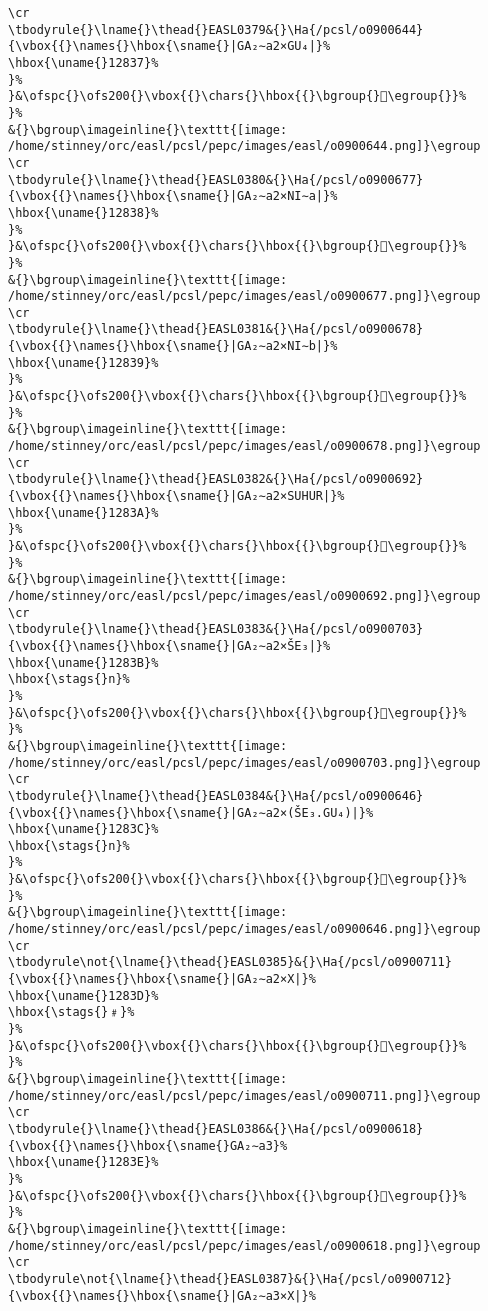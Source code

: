 \begin{verbatim}
\cr
\tbodyrule{}\lname{}\thead{}EASL0379&{}\Ha{/pcsl/o0900644}{\vbox{{}\names{}\hbox{\sname{}|GA₂∼a2×GU₄|}%
\hbox{\uname{}12837}%
}%
}&\ofspc{}\ofs200{}\vbox{{}\chars{}\hbox{{}\bgroup{}𒠷\egroup{}}%
}%
&{}\bgroup\imageinline{}\texttt{[image: /home/stinney/orc/easl/pcsl/pepc/images/easl/o0900644.png]}\egroup
\cr
\tbodyrule{}\lname{}\thead{}EASL0380&{}\Ha{/pcsl/o0900677}{\vbox{{}\names{}\hbox{\sname{}|GA₂∼a2×NI∼a|}%
\hbox{\uname{}12838}%
}%
}&\ofspc{}\ofs200{}\vbox{{}\chars{}\hbox{{}\bgroup{}𒠸\egroup{}}%
}%
&{}\bgroup\imageinline{}\texttt{[image: /home/stinney/orc/easl/pcsl/pepc/images/easl/o0900677.png]}\egroup
\cr
\tbodyrule{}\lname{}\thead{}EASL0381&{}\Ha{/pcsl/o0900678}{\vbox{{}\names{}\hbox{\sname{}|GA₂∼a2×NI∼b|}%
\hbox{\uname{}12839}%
}%
}&\ofspc{}\ofs200{}\vbox{{}\chars{}\hbox{{}\bgroup{}𒠹\egroup{}}%
}%
&{}\bgroup\imageinline{}\texttt{[image: /home/stinney/orc/easl/pcsl/pepc/images/easl/o0900678.png]}\egroup
\cr
\tbodyrule{}\lname{}\thead{}EASL0382&{}\Ha{/pcsl/o0900692}{\vbox{{}\names{}\hbox{\sname{}|GA₂∼a2×SUHUR|}%
\hbox{\uname{}1283A}%
}%
}&\ofspc{}\ofs200{}\vbox{{}\chars{}\hbox{{}\bgroup{}𒠺\egroup{}}%
}%
&{}\bgroup\imageinline{}\texttt{[image: /home/stinney/orc/easl/pcsl/pepc/images/easl/o0900692.png]}\egroup
\cr
\tbodyrule{}\lname{}\thead{}EASL0383&{}\Ha{/pcsl/o0900703}{\vbox{{}\names{}\hbox{\sname{}|GA₂∼a2×ŠE₃|}%
\hbox{\uname{}1283B}%
\hbox{\stags{}n}%
}%
}&\ofspc{}\ofs200{}\vbox{{}\chars{}\hbox{{}\bgroup{}𒠻\egroup{}}%
}%
&{}\bgroup\imageinline{}\texttt{[image: /home/stinney/orc/easl/pcsl/pepc/images/easl/o0900703.png]}\egroup
\cr
\tbodyrule{}\lname{}\thead{}EASL0384&{}\Ha{/pcsl/o0900646}{\vbox{{}\names{}\hbox{\sname{}|GA₂∼a2×(ŠE₃.GU₄)|}%
\hbox{\uname{}1283C}%
\hbox{\stags{}n}%
}%
}&\ofspc{}\ofs200{}\vbox{{}\chars{}\hbox{{}\bgroup{}𒠼\egroup{}}%
}%
&{}\bgroup\imageinline{}\texttt{[image: /home/stinney/orc/easl/pcsl/pepc/images/easl/o0900646.png]}\egroup
\cr
\tbodyrule\not{\lname{}\thead{}EASL0385}&{}\Ha{/pcsl/o0900711}{\vbox{{}\names{}\hbox{\sname{}|GA₂∼a2×X|}%
\hbox{\uname{}1283D}%
\hbox{\stags{}﹟}%
}%
}&\ofspc{}\ofs200{}\vbox{{}\chars{}\hbox{{}\bgroup{}𒠽\egroup{}}%
}%
&{}\bgroup\imageinline{}\texttt{[image: /home/stinney/orc/easl/pcsl/pepc/images/easl/o0900711.png]}\egroup
\cr
\tbodyrule{}\lname{}\thead{}EASL0386&{}\Ha{/pcsl/o0900618}{\vbox{{}\names{}\hbox{\sname{}GA₂∼a3}%
\hbox{\uname{}1283E}%
}%
}&\ofspc{}\ofs200{}\vbox{{}\chars{}\hbox{{}\bgroup{}𒠾\egroup{}}%
}%
&{}\bgroup\imageinline{}\texttt{[image: /home/stinney/orc/easl/pcsl/pepc/images/easl/o0900618.png]}\egroup
\cr
\tbodyrule\not{\lname{}\thead{}EASL0387}&{}\Ha{/pcsl/o0900712}{\vbox{{}\names{}\hbox{\sname{}|GA₂∼a3×X|}%

\end{verbatim}
